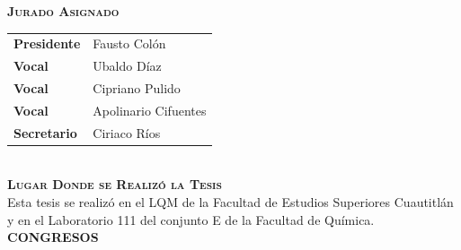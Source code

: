 \begin{center}
	\textbf{\Large\textsc{Jurado Asignado}}\\[1.5cm]
	
	
\begin{tabular}{p{3.5cm}l}
	\textbf{Presidente}	& Fausto Colón\\ 
	\textbf{Vocal} & Ubaldo Díaz\\
	\textbf{Vocal} & Cipriano Pulido\\
	\textbf{Vocal} & Apolinario Cifuentes\\
	\textbf{Secretario}& Ciriaco Ríos\\
\end{tabular}\\[1.5cm]

	\textbf{\textsc{Lugar Donde se Realizó la Tesis}}\\[.6cm]
	
	Esta tesis se realizó en el \ac{LQM} de la Facultad de Estudios Superiores Cuautitlán y en el Laboratorio 111 del conjunto E de la Facultad de Química.\\[1.5cm] 
	
	\textbf{CONGRESOS}\\[0.6cm]
	

\end{center}
